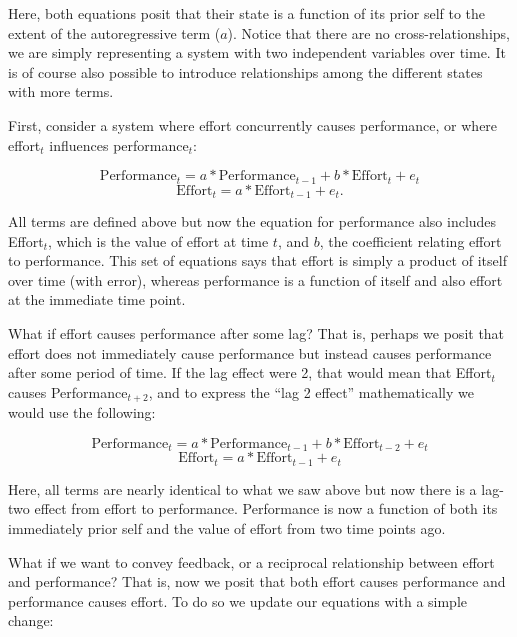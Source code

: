 \documentclass[english,,man]{apa6}
\theoremstyle{definition}
\theoremstyle{definition}
\theoremstyle{definition}
\theoremstyle{remark}
\begin{document}
\noindent Here, both equations posit that their state is a function of
its prior self to the extent of the autoregressive term (\(a\)). Notice
that there are no cross-relationships, we are simply representing a
system with two independent variables over time. It is of course also
possible to introduce relationships among the different states with more
terms.

First, consider a system where effort concurrently causes performance,
or where effort\(_t\) influences performance\(_t\):

\begin{equation}
\label{sysy2}
\textrm{Performance}_{t} = a * \textrm{Performance}_{t - 1} + b * \textrm{Effort}_{t} + e_{t}
\end{equation} \begin{equation}
\label{sysx2}
\textrm{Effort}_{t} = a * \textrm{Effort}_{t - 1} + e_{t}.
\end{equation}

\noindent All terms are defined above but now the equation for
performance also includes Effort\(_t\), which is the value of effort at
time \(t\), and \(b\), the coefficient relating effort to performance.
This set of equations says that effort is simply a product of itself
over time (with error), whereas performance is a function of itself and
also effort at the immediate time point.

What if effort causes performance after some lag? That is, perhaps we
posit that effort does not immediately cause performance but instead
causes performance after some period of time. If the lag effect were 2,
that would mean that Effort\(_t\) causes Performance\(_{t+2}\), and to
express the \enquote{lag 2 effect} mathematically we would use the
following:

\begin{equation}
\label{sysy3}
\textrm{Performance}_{t} = a * \textrm{Performance}_{t - 1} + b * \textrm{Effort}_{t - 2} + e_{t}
\end{equation} \begin{equation}
\label{sysx3}
\textrm{Effort}_{t} = a * \textrm{Effort}_{t - 1} + e_{t}
\end{equation}

\noindent Here, all terms are nearly identical to what we saw above but
now there is a lag-two effect from effort to performance. Performance is
now a function of both its immediately prior self and the value of
effort from two time points ago.

What if we want to convey feedback, or a reciprocal relationship between
effort and performance? That is, now we posit that both effort causes
performance and performance causes effort. To do so we update our
equations with a simple change:
\end{document}
